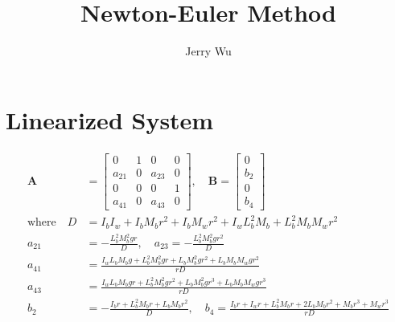 \documentclass[12pt]{article}
\begin{document}
\title{\Huge Newton-Euler Method}
\author{Jerry Wu}
\date{}
\maketitle

\section*{Linearized System}
\begin{align*}
\mathbf{A} &= 
\begin{bmatrix}
0 & 1 & 0 & 0 \\[8pt]
a_{21} & 0 & a_{23} & 0 \\[8pt]
0 & 0 & 0 & 1 \\[8pt]
a_{41} & 0 & a_{43} & 0
\end{bmatrix}, 
\quad 
\mathbf{B} = 
\begin{bmatrix}
0 \\[8pt]
b_2 \\[8pt]
0 \\[8pt]
b_4
\end{bmatrix} \\[12pt]
%
\text{where} \quad
D &= I_b I_w + I_b M_b r^2 + I_b M_w r^2 + I_w L_b^2 M_b + L_b^2 M_b M_w r^2 \\[8pt]
%
a_{21} &= -\frac{L_b^2 M_b^2 g r}{D}, 
\quad a_{23} = -\frac{L_b^2 M_b^2 g r^2}{D} \\[8pt]
%
a_{41} &= \frac{I_w L_b M_b g + L_b^2 M_b^2 g r + L_b M_b^2 g r^2 + L_b M_b M_w g r^2}{r D} \\[8pt]
%
a_{43} &= \frac{I_w L_b M_b g r + L_b^2 M_b^2 g r^2 + L_b M_b^2 g r^3 + L_b M_b M_w g r^3}{r D} \\[8pt]
%
b_2 &= -\frac{I_b r + L_b^2 M_b r + L_b M_b r^2}{D}, 
\quad b_4 = \frac{I_b r + I_w r + L_b^2 M_b r + 2 L_b M_b r^2 + M_b r^3 + M_w r^3}{r D}
\end{align*}
\end{document}
